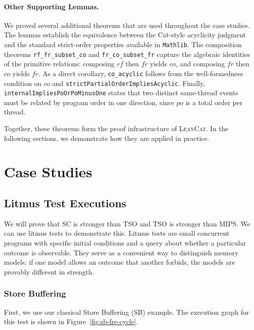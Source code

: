 \paragraph{Other Supporting Lemmas.}
We proved several additional theorems that are used
throughout the case studies. The lemmas establish the equivalence between the Cat-style
acyclicity judgment and the standard strict-order properties available in \texttt{Mathlib}.
The composition theorems \texttt{rf\_fr\_subset\_co} and \texttt{fr\_co\_subset\_fr} capture
the algebraic identities of the primitive relations: composing $\mathit{rf}$ then $\mathit{fr}$
yields $\mathit{co}$, and composing $\mathit{fr}$ then $\mathit{co}$ yields $\mathit{fr}$.
As a direct corollary, \texttt{co\_acyclic} follows from the well-formedness condition on
$\mathit{co}$ and \texttt{strictPartialOrderImpliesAcyclic}. Finally,
\texttt{internalImpliesPoOrPoMinusOne} states that two distinct same-thread events must be
related by program order in one direction, since $\mathit{po}$ is a total order per thread.
 
Together, these theorems form the proof infrastructure of \textsc{LeanCat}. In the following sections,
we demonstrate how they are applied in practice.
 

\section{Case Studies}
\label{sec:case-studies}
\subsection{Litmus Test Executions}
\label{sec:snippets}

We will prove that SC is stronger than TSO and TSO is stronger than MIPS. We can use litmus tests to demonstrate this. Litmus tests are small concurrent programs with specific initial conditions and a query about whether a particular outcome is observable. They serve as a convenient way to distinguish memory models: if one model allows an outcome that another forbids, the models are provably different in strength.

\subsubsection{Store Buffering}

First, we use our classical Store Buffering (SB) example. The execution graph for this test is shown in Figure~\ref{fig:sb-fre-cycle}.

